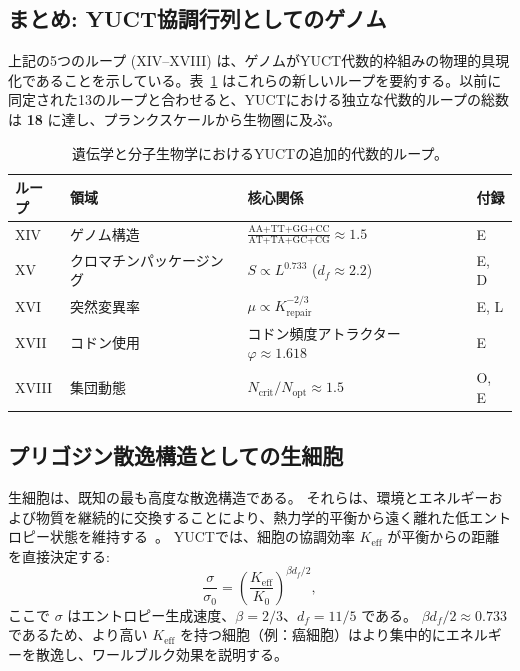 \documentclass[12pt]{article}
\newcommand{\Keff}{K_{\mathrm{eff}}}
\begin{document}
	\subsection{まとめ: YUCT協調行列としてのゲノム}
	
	上記の5つのループ (XIV–XVIII) は、ゲノムがYUCT代数的枠組みの物理的具現化であることを示している。表~\ref{tab:genetic-loops} はこれらの新しいループを要約する。以前に同定された13のループと合わせると、YUCTにおける独立な代数的ループの総数は \textbf{18} に達し、プランクスケールから生物圏に及ぶ。
	
	\begin{table}[htbp]
		\centering
		\caption{遺伝学と分子生物学におけるYUCTの追加的代数的ループ。}
		\label{tab:genetic-loops}
		\footnotesize
		\begin{tabular}{p{2.5cm} p{3cm} p{5cm} p{3cm}}
			\toprule
			\textbf{ループ} & \textbf{領域} & \textbf{核心関係} & \textbf{付録} \\
			\midrule
			XIV & ゲノム構造 & \(\frac{\text{AA+TT+GG+CC}}{\text{AT+TA+GC+CG}} \approx 1.5\) & E \\
			XV & クロマチンパッケージング & \(S \propto L^{0.733}\) (\(d_f \approx 2.2\)) & E, D \\
			XVI & 突然変異率 & \(\mu \propto K_{\mathrm{repair}}^{-2/3}\) & E, L \\
			XVII & コドン使用 & コドン頻度アトラクター \(\varphi \approx 1.618\) & E \\
			XVIII & 集団動態 & \(N_{\mathrm{crit}}/N_{\mathrm{opt}} \approx 1.5\) & O, E \\
			\bottomrule
		\end{tabular}
	\end{table}
	
	\subsection{プリゴジン散逸構造としての生細胞}
	\label{subsec:prigogine}
	
	生細胞は、既知の最も高度な散逸構造である。
	それらは、環境とエネルギーおよび物質を継続的に交換することにより、熱力学的平衡から遠く離れた低エントロピー状態を維持する~\cite{Prigogine1977}。
	YUCTでは、細胞の協調効率 $\Keff$ が平衡からの距離を直接決定する:
	\begin{equation}
		\frac{\sigma}{\sigma_0} = \left( \frac{\Keff}{K_0} \right)^{\beta d_f / 2},
	\end{equation}
	ここで $\sigma$ はエントロピー生成速度、$\beta=2/3$、$d_f=11/5$ である。
	$\beta d_f / 2 \approx 0.733$ であるため、より高い $\Keff$ を持つ細胞（例：癌細胞）はより集中的にエネルギーを散逸し、ワールブルク効果を説明する。
	
\end{document}
